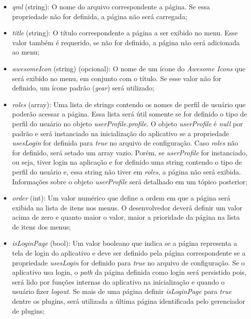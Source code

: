 \begin{itemize}
	\item \textit{qml} (string): O nome do arquivo correspondente a página. Se essa propriedade não for definida, a página não será carregada;

	\item \textit{title} (string): O título correspondente a página a ser exibido no menu. Esse valor também é requerido, se não for definido, a página não será adicionada ao menu;

	\item \textit{awesomeIcon} (string) (opcional): O nome de um ícone do \textit{Awesome Icons} que será exibido no menu, em conjunto com o título. Se esse valor não for definido, um ícone padrão (\textit{gear}) será utilizado;

	\item \textit{roles} (array): Uma lista de strings contendo os nomes de perfil de usuário que poderão acessar a página. Essa lista será útil somente se for definido o tipo de perfil do usuário no objeto \textit{userProfile.profile}. O objeto \textit{userProfile} é \textit{null} por padrão e será instanciado na inicialização do aplicativo se a propriedade \textit{usesLogin} for definida para \textit{true} no arquivo de configuração. Caso \textit{roles} não for definido, será setado um array vazio. Porém, se \textit{userProfile} for instanciado, ou seja, tiver login na aplicação e for definido uma string contendo o tipo de perfil do usuário e, essa string não tiver em \textit{roles}, a página não será exibida. Informações sobre o objeto \textit{userProfile} será detalhado em um tópico posterior;

	\item \textit{order} (int): Um valor numérico que define a ordem em que a página será exibida na lista de itens nos menus. O desenvolvedor deverá definir um valor acima de zero e quanto maior o valor, maior a prioridade da página na lista de itens dos menus;

	\item \textit{isLoginPage} (bool): Um valor booleano que indica se a página representa a tela de login do aplicativo e deve ser definido pela página correspondente se a propriedade \textit{usesLogin} for definido para \textit{true} no arquivo de configuração. Se o aplicativo usa login, o \textit{path} da página definida como login será persistido pois, será lido por funções internas do aplicativo na inicialização e quando o usuário fizer \textit{logout}. Se mais de uma página definir \textit{isLoginPage} para \textit{true} dentre os plugins, será utilizada a última página identificada pelo gerenciador de plugins;


\end{itemize}
